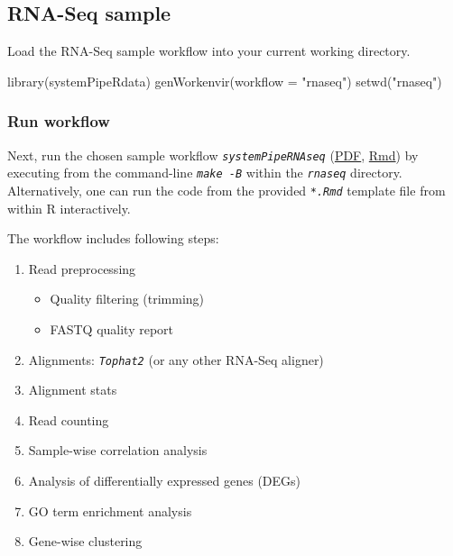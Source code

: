 \documentclass[14pt,]{article}
\providecommand{\tightlist}{%
  \setlength{\itemsep}{0pt}\setlength{\parskip}{0pt}}
\newcommand{\hlstr}[1]{\textcolor[rgb]{0.251,0.627,0.251}{#1}}%
\newcommand{\hlstd}[1]{\textcolor[rgb]{0.251,0.251,0.251}{#1}}%
\newenvironment{Shaded}{\begin{myshaded}}{\end{myshaded}}
\newcommand{\StringTok}[1]{\hlstr{#1}}
\newcommand{\FunctionTok}[1]{\hlstd{#1}}
\newcommand{\AttributeTok}[1]{{#1}}
\newcommand{\NormalTok}[1]{\hlstd{#1}}
\begin{document}
\hypertarget{rna-seq-sample}{%
\subsection{RNA-Seq sample}\label{rna-seq-sample}}

Load the RNA-Seq sample workflow into your current working directory.

\begin{Shaded}
\begin{Highlighting}[]
\FunctionTok{library}\NormalTok{(systemPipeRdata)}
\FunctionTok{genWorkenvir}\NormalTok{(}\AttributeTok{workflow =} \StringTok{"rnaseq"}\NormalTok{)}
\FunctionTok{setwd}\NormalTok{(}\StringTok{"rnaseq"}\NormalTok{)}
\end{Highlighting}
\end{Shaded}

\hypertarget{run-workflow}{%
\subsubsection{Run workflow}\label{run-workflow}}

Next, run the chosen sample workflow \emph{\texttt{systemPipeRNAseq}} (\href{https://github.com/tgirke/systemPipeRdata/blob/master/inst/extdata/workflows/rnaseq/systemPipeRNAseq.pdf?raw=true}{PDF}, \href{https://github.com/tgirke/systemPipeRdata/blob/master/inst/extdata/workflows/rnaseq/systemPipeRNAseq.Rmd}{Rmd}) by executing from the command-line \emph{\texttt{make -B}} within the \emph{\texttt{rnaseq}} directory. Alternatively, one can run the code from the provided \emph{\texttt{*.Rmd}} template file from within R interactively.

The workflow includes following steps:

\begin{enumerate}
\def\labelenumi{\arabic{enumi}.}
\tightlist
\item
  Read preprocessing

  \begin{itemize}
  \tightlist
  \item
    Quality filtering (trimming)
  \item
    FASTQ quality report
  \end{itemize}
\item
  Alignments: \emph{\texttt{Tophat2}} (or any other RNA-Seq aligner)
\item
  Alignment stats
\item
  Read counting
\item
  Sample-wise correlation analysis
\item
  Analysis of differentially expressed genes (DEGs)
\item
  GO term enrichment analysis
\item
  Gene-wise clustering
\end{enumerate}
\end{document}
